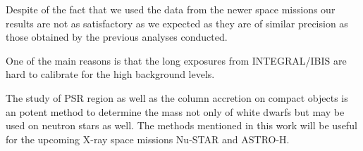 \documentclass[oneside,a4paper,11pt]{report}
\begin{document}
Despite of the fact that we used the data from the newer space missions our results are not 
as satisfactory as we expected as they are of similar precision as those obtained by the 
previous analyses conducted. 

One of the main reasons is that the long exposures from INTEGRAL/IBIS are hard to 
calibrate for the high background levels. 

The study of PSR region as well as the column accretion on compact objects is an potent 
method to determine the mass not only of white dwarfs but may be used on neutron stars as 
well. The methods mentioned in this work will be useful for the upcoming X-ray space 
missions Nu-STAR and ASTRO-H.   


\nocite{2004bhwd.book.....S}
\nocite{2009A&A...496..121B}
\nocite{accpower:1}
\nocite{2005A&A...435..191S}
\nocite{2008A&A...489.1121R}
\nocite{2010A&A...520A..25Y}
\nocite{warner:1}
\nocite{2006A&A...450..117S}
\nocite{rybicki:1}
\nocite{1973PThPh..49.1184A_aizu}
\nocite{astrop_techniques_5th}
\nocite{xray_hanbook}
\nocite{1972ApJ...175..417N}
\nocite{kleczek}
\nocite{comp_obj1}
\nocite{1939MNRAS..99..673C}
\nocite{2012MNRAS.419..336M}




\end{document}
